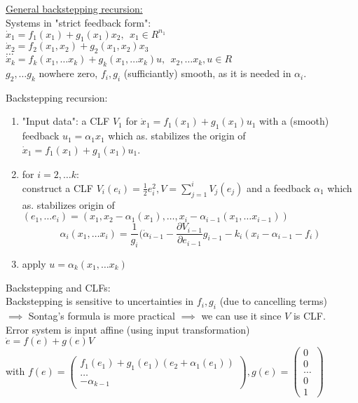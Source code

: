 \underline{General backstepping recursion:}\\
Systems in "strict feedback form":\\
$\dot x_1 = f_1(x_1)+g_1(x_1)x_2, \ \ x_1 \in R^{n_1}$\\
$\dot x_2 = f_2(x_1,x_2)+g_2(x_1,x_2)x_3$\\
$\dots$\\
$\dot x_k = f_k(x_1,\dots x_k)+g_k(x_1,\dots x_k)u, \ \ x_2, \dots x_k, u \in R$\\
$g_2, \dots g_k$ nowhere zero, $f_i,g_i$ (sufficiantly) smooth, as it is needed in $\alpha_i$.


Backstepping recursion:
\begin{enumerate}
    \item "Input data": a CLF $V_1$ for $\dot x_1 = f_1(x_1)+g_1(x_1)u_1$ with a (smooth) feedback $u_1=\alpha_1x_1$ which as. stabilizes the origin of $\dot x_1 = f_1(x_1)+g_1(x_1)u_1$.
    \item for $i=2, \dots k$:\\
    construct a CLF $V_i(e_i)=\frac{1}{2}e_i^2, V = \sum \limits_{j=1}^iV_j(e_j)$ and a feedback $\alpha_1$ which as. stabilizes origin of $(e_1, \dots e_i) = (x_1,x_2-\alpha_1(x_1), \dots, x_i - \alpha_{i-1}(x_1, \dots x_{i-1}))$
    $$\alpha_i(x_1, \dots x_i) = \frac{1}{g_i}(\dot \alpha_{i-1} - \frac{\partial V_{i-1}}{\partial e_{i-1}}g_{i-1}-k_i(x_i-\alpha_{i-1}-f_i)$$
    \item apply $u=\alpha_k(x_1, \dots x_k)$
\end{enumerate}

Backstepping and CLFs:\\
Backstepping is sensitive to uncertainties in $f_i,g_i$ (due to cancelling terms)\\
$\implies$  Sontag's formula is more practical $\implies$ we can use it since $V$ is CLF. \\

Error system is input affine (using input transformation)\\
$\dot e = f(e)+g(e)V$\\
with $f(e) = \begin{pmatrix}
            f_1(e_1)+g_1(e_1)(e_2+\alpha_1(e_1)) \\
            \dots \\
            - \alpha_{k-1}
            \end{pmatrix}, 
    g(e) =\begin{pmatrix}
            0 \\
            0 \\
            \dots \\
            0 \\
            1
            \end{pmatrix}$\\

